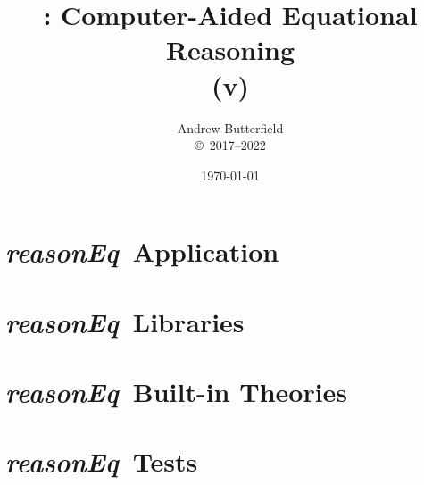 \documentclass[fleqn,10pt]{report}
\author{
Andrew Butterfield
\\
{\small \copyright\ 2017--2022}
}
\title{
  \reasonEq: Computer-Aided Equational Reasoning
  \\(v\reqVersion)
}
\date{
\today
}
\def\reasonEq{\textit{\textsf{reasonEq}}}
\begin{document}
\maketitle
\tableofcontents

\chapter{\reasonEq\ Application}



\chapter{\reasonEq\ Libraries}


\newpage
\newpage
\newpage
\newpage
\newpage
\newpage
\newpage
\newpage
\newpage
\newpage
\newpage
\newpage
\newpage
\newpage
\newpage
\newpage
\newpage
\newpage
\newpage
\newpage
\newpage
\newpage
\newpage
\newpage
\newpage
\newpage
\newpage
\newpage
\newpage
\newpage

\chapter{\reasonEq\ Built-in Theories}
\newpage
\newpage
\newpage
\newpage
\newpage
\newpage
\newpage
\newpage
\newpage
\newpage
\newpage
%
\newpage
\newpage
\newpage
\newpage

\chapter{\reasonEq\ Tests}
\end{document}

